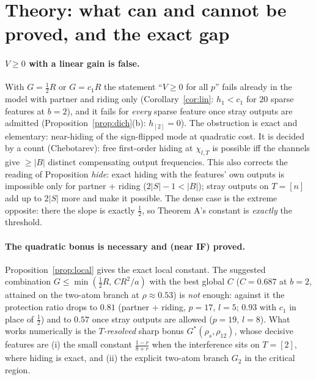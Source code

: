 \documentclass[11pt]{article}
\theoremstyle{definition}
\begin{document}
\section{Theory: what can and cannot be proved, and the exact gap}\label{sec:gap}
\paragraph{$V\ge0$ with a linear gain is false.}  With $G=\frac12R$ or $G=c_1R$ the statement ``$V\ge0$ for all $p$'' fails already in the
model with partner and riding only (Corollary~\ref{cor:lin}: $h_1<c_1$ for $20$ sparse features at $b=2$), and it fails for \emph{every} sparse
feature once stray outputs are admitted (Proposition~\ref{prop:dich}(b): $h_{[2]}=0$).  The obstruction is exact and elementary: near-hiding of the
sign-flipped mode at quadratic cost.  It is decided by a count (Chebotarev): free first-order hiding at $\chi_{l,T}$ is possible iff the channels give
$\ge|B|$ distinct compensating output frequencies.  This also corrects the reading of Proposition \emph{hide}: exact hiding with the features' own
outputs is impossible only for partner + riding ($2|S|-1<|B|$); stray outputs on $T=[n]$ add up to $2|S|$ more and make it possible.  The dense case is
the extreme opposite: there the slope is exactly $\frac12$, so Theorem A's constant is \emph{exactly} the threshold.

\paragraph{The quadratic bonus is necessary and (near IF) proved.}  Proposition~\ref{prop:local} gives the exact local constant.  The suggested
combination $G\le\min(\frac12R,\,CR^2/a)$ with the best global $C$ ($C=0.687$ at $b=2$, attained on the two-atom branch at $\rho\approx0.53$) is \emph{not}
enough: against it the protection ratio drops to $0.81$ (partner + riding, $p=17$, $l=5$; $0.93$ with $c_1$ in place of $\frac12$) and to $0.57$ once stray
outputs are allowed ($p=19$, $l=8$).  What works numerically is the \emph{$T$-resolved} sharp bonus $G^*(\rho_s,\rho_{12})$, whose decisive features are
(i) the small constant $\frac{1-r}{8+r}$ when the interference sits on $T=[2]$, where hiding is exact, and (ii) the explicit two-atom branch $G_2$ in the
critical region.
\end{document}
